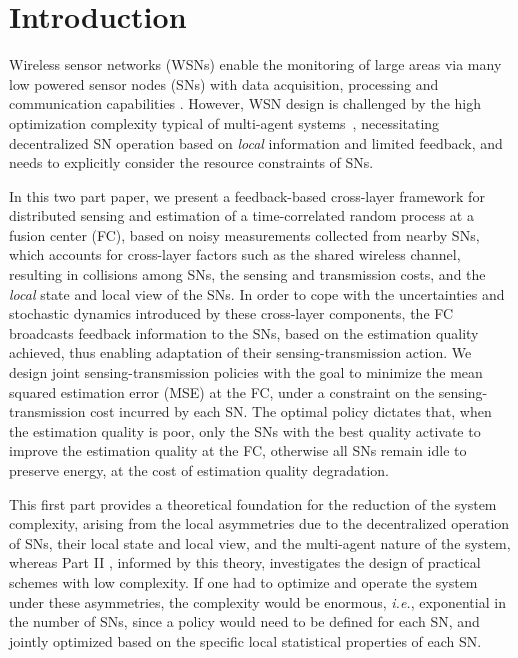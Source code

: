 \documentclass[10pt,twocolumn,twoside]{IEEEtran}
\theoremstyle{plain}
\begin{document}
\section{Introduction}
Wireless sensor networks (WSNs) enable the monitoring of large areas via many low powered sensor nodes (SNs)
with data acquisition, processing and communication capabilities \cite{Romer}.
However, WSN design is challenged by
the high optimization complexity typical of multi-agent systems~\cite{Bernstein},
necessitating decentralized SN operation based on \emph{local} information and limited feedback,
and needs to explicitly consider the resource constraints of SNs.

In this two part paper, we present a {feedback-based} cross-layer framework for distributed sensing and estimation of a time-correlated random process at a fusion center (FC),
based on noisy measurements collected from nearby SNs,
which accounts for cross-layer factors such as the shared wireless channel, resulting in collisions among SNs, the sensing and transmission costs,
and the \emph{local} state and local view of the SNs.
{In order to cope with the uncertainties and stochastic dynamics introduced by these cross-layer components,}
the FC broadcasts feedback information to the SNs, based on the estimation quality achieved, thus enabling 
adaptation of their sensing-transmission action.
We design joint sensing-transmission policies with
the goal to minimize the mean squared estimation error (MSE) at the FC,
under a constraint on the sensing-transmission cost incurred by each SN.
 The optimal policy dictates that, when the estimation quality is poor, only the SNs with the best quality activate to improve the estimation quality at the FC, otherwise all SNs remain idle to preserve energy, at the cost of estimation quality degradation.
 
  
This first part provides a theoretical foundation for the reduction of the system complexity,
arising from the local asymmetries
 due to the decentralized operation of SNs, their local state and local view, and the multi-agent nature of the system,
 whereas Part II \cite{MichelusiP2}, informed by this theory,
investigates the design of practical schemes with low complexity.
  If one had to optimize and operate  the system under these asymmetries, the complexity would be enormous,
  \emph{i.e.}, exponential in the number of SNs, since a policy would need to be defined for each SN, and jointly optimized based on the specific local statistical properties of each SN.
\end{document}
